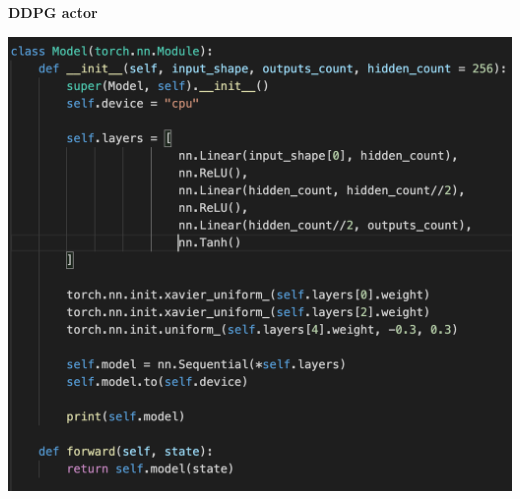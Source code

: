 \documentclass[xcolor=dvipsnames]{beamer}
\begin{document}
\begin{frame}{\bf DDPG actor}

  {\centering \includegraphics[scale=0.4]{../images/ddpg_actor.png}}
\end{frame}
\end{document}
